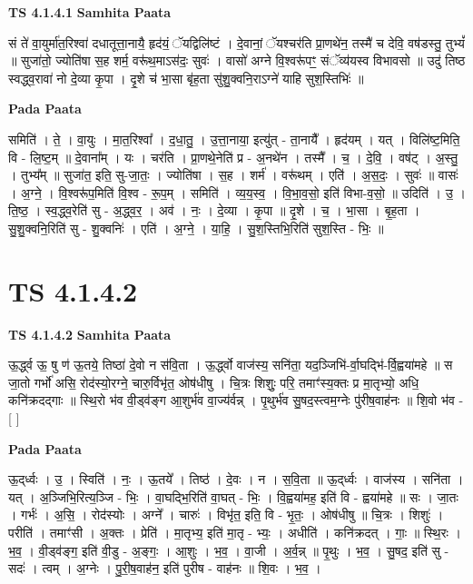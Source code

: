 \documentclass[17pt]{extarticle}
\begin{document}
\textbf{TS 4.1.4.1 } \newline
\textbf{Samhita Paata} \newline

सं ते॑ वा॒युर्मा॑त॒रिश्वा॑ दधातूत्ता॒नायै॒ हृद॑यं॒ ॅयद्विलि॑ष्टं । दे॒वानां॒ ॅयश्चर॑ति प्रा॒णथे॑न॒ तस्मै॑ च देवि॒ वष॑डस्तु॒ तुभ्यं᳚ ॥ सुजा॑तो॒ ज्योति॑षा स॒ह शर्म॒ वरू॑थ॒माऽस॑दः॒ सुवः॑ । वासो॑ अग्ने वि॒श्वरू॑पꣳ॒॒ संॅव्य॑यस्व विभावसो ॥ उदु॑ तिष्ठ स्वद्ध्व॒रावा॑ नो दे॒व्या कृ॒पा । दृ॒शे च॑ भा॒सा बृ॑ह॒ता सु॑शु॒क्वनि॒राऽग्ने॑ याहि सुश॒स्तिभिः॑ ॥ \newline

\textbf{Pada Paata} \newline

समिति॑ । ते॒ । वा॒युः । मा॒त॒रिश्वा᳚ । द॒धा॒तु॒ । उ॒त्ता॒नाया॒ इत्यु॑त् - ता॒नायै᳚ । हृद॑यम् । यत् । विलि॑ष्ट॒मिति॒ वि - लि॒ष्ट॒म् ॥ दे॒वाना᳚म् । यः । चर॑ति । प्रा॒णथे॒नेति॑ प्र - अ॒नथे॑न । तस्मै᳚ । च॒ । दे॒वि॒ । वष॑ट् । अ॒स्तु॒ । तुभ्य᳚म् ॥ सुजा॑त॒ इति॒ सु-जा॒तः॒ । ज्योति॑षा । स॒ह । शर्म॑ । वरू॑थम् । एति॑ । अ॒स॒दः॒ । सुवः॑ ॥ वासः॑ । अ॒ग्ने॒ । वि॒श्वरू॑प॒मिति॑ वि॒श्व - रू॒प॒म् । समिति॑ । व्य॒य॒स्व॒ । वि॒भा॒व॒सो॒ इति॑ विभा-व॒सो॒ ॥ उदिति॑ । उ॒ । ति॒ष्ठ॒ । स्व॒द्ध्व॒रेति॑ सु - अ॒द्ध्व॒र॒ । अव॑ । नः॒ । दे॒व्या । कृ॒पा ॥ दृ॒शे । च॒ । भा॒सा । बृ॒ह॒ता । सु॒शु॒क्वनि॒रिति॑ सु - शु॒क्वनिः॑ । एति॑ । अ॒ग्ने॒ । या॒हि॒ । सु॒श॒स्तिभि॒रिति॑ सुश॒स्ति - भिः॒ ॥  \newline





\section{ TS 4.1.4.2 }

\textbf{TS 4.1.4.2 } \newline
\textbf{Samhita Paata} \newline

ऊ॒र्द्ध्व ऊ॒ षु ण॑ ऊ॒तये॒ तिष्ठा॑ दे॒वो न स॑वि॒ता । ऊ॒र्द्ध्वो वाज॑स्य॒ सनि॑ता॒ यद॒ञ्जिभि॑-र्वा॒घद्भि॑-र्वि॒ह्वया॑महे ॥ स जा॒तो गर्भो॑ असि॒ रोद॑स्यो॒रग्ने॒ चारु॒र्विभृ॑त॒ ओष॑धीषु । चि॒त्रः शिशुः॒ परि॒ तमाꣳ॑स्य॒क्तः प्र मा॒तृभ्यो॒ अधि॒ कनि॑क्रदद्गाः ॥ स्थि॒रो भ॑व वी॒ड्व॑ङ्ग आ॒शुर्भ॑व वा॒ज्य॑र्वन्न् । पृ॒थुर्भ॑व सु॒षद॒स्त्वम॒ग्नेः पु॑रीष॒वाह॑नः ॥ शि॒वो भ॑व - [  ] \newline

\textbf{Pada Paata} \newline

ऊ॒द्‌र्ध्वः । उ॒ । स्विति॑ । नः॒ । ऊ॒तये᳚ । तिष्ठ॑ । दे॒वः । न । स॒वि॒ता ॥ ऊ॒द्‌र्ध्वः । वाज॑स्य । सनि॑ता । यत् । अ॒ञ्जिभि॒रित्य॒ञ्जि - भिः॒ । वा॒घद्भि॒रिति॑ वा॒घत् - भिः॒ । वि॒ह्वया॑मह॒ इति॑ वि - ह्वया॑महे ॥ सः । जा॒तः । गर्भः॑ । अ॒सि॒ । रोद॑स्योः । अग्ने᳚ । चारुः॑ । विभृ॑त॒ इति॒ वि - भृ॒तः॒ । ओष॑धीषु ॥ चि॒त्रः । शिशुः॑ । परीति॑ । तमाꣳ॑सी । अ॒क्तः । प्रेति॑ । मा॒तृभ्य॒ इति॑ मा॒तृ - भ्यः॒ । अधीति॑ । कनि॑क्रदत् । गाः॒ ॥ स्थि॒रः । भ॒व॒ । वी॒ड्व॑ङ्ग॒ इति॑ वी॒डु - अ॒ङ्गः॒ । आ॒शुः । भ॒व॒ । वा॒जी । अ॒र्व॒न्न् ॥ पृ॒थुः । भ॒व॒ । सु॒षद॒ इति॑ सु - सदः॑ । त्वम् । अ॒ग्नेः । पु॒री॒ष॒वाह॑न॒ इति॑ पुरीष - वाह॑नः ॥ शि॒वः । भ॒व॒ ।  \newline
\end{document}
